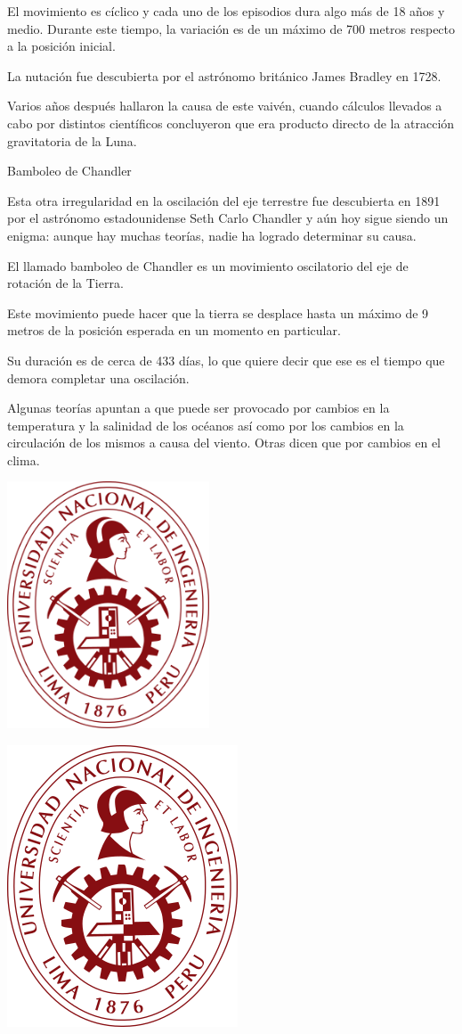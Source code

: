 \documentclass[12pt,a4paer]{article}
\begin{document}
El movimiento es cíclico y cada uno de los episodios dura algo más de 18 años y medio. Durante este tiempo, 
la variación es de un máximo de 700 metros respecto a la posición inicial.

La nutación fue descubierta por el astrónomo británico James Bradley en 1728.

Varios años después hallaron la causa de este vaivén, cuando cálculos llevados a cabo por distintos científicos 
concluyeron que era producto directo de la atracción gravitatoria de la Luna.


Bamboleo de Chandler

Esta otra irregularidad en la oscilación del eje terrestre fue descubierta en 1891 por el astrónomo estadounidense 
Seth Carlo Chandler y aún hoy sigue siendo un enigma: aunque hay muchas teorías, nadie ha logrado determinar su causa.

El llamado bamboleo de Chandler es un movimiento oscilatorio del eje de rotación de la Tierra.

Este movimiento puede hacer que la tierra se desplace hasta un máximo de 9 metros de la posición esperada en un 
momento en particular.

Su duración es de cerca de 433 días, lo que quiere decir que ese es el tiempo que demora completar una oscilación.

Algunas teorías apuntan a que puede ser provocado por cambios en la temperatura y la salinidad de los océanos así 
como por los cambios en la circulación de los mismos a causa del viento. Otras dicen que por cambios en el clima.

\listoffigures

\includegraphics[width=6cm]{logo}

\includegraphics[scale=0.05]{logo}
\end{document}
